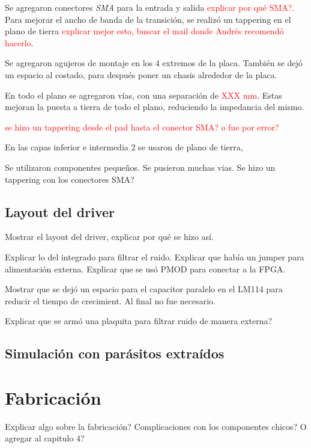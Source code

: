 Se agregaron conectores \textit{SMA} para la entrada y salida
\textcolor{red}{explicar por qué SMA?}. Para mejorar el ancho de banda de la
transición, se realizó un tappering en el plano de tierra
\textcolor{red}{explicar mejor esto, buscar el mail donde Andrés recomendó
hacerlo}.

Se agregaron agujeros de montaje en los 4 extremos de la placa. También se dejó
un espacio al costado, para después poner un chasis alrededor de la placa.

En todo el plano se agregaron vías, con una separación de \textcolor{red}{XXX
mm}. Estas mejoran la puesta a tierra de todo el plano, reduciendo la impedancia
del mismo.

\textcolor{red}{se hizo un tappering desde el pad hasta el conector SMA? o fue
por error?}

En las capas inferior e intermedia 2 se usaron de plano de tierra,

Se utilizaron componentes pequeños. Se pusieron muchas vias. Se hizo un
tappering con los conectores SMA?

\subsection{Layout del driver}

Mostrar el layout del driver, explicar por qué se hizo así.

Explicar lo del integrado para filtrar el ruido. Explicar que había un jumper
para alimentación externa. Explicar que se usó PMOD para conectar a la FPGA.

Mostrar que se dejó un espacio para el capacitor paralelo en el LM114 para
reducir el tiempo de crecimient. Al final no fue necesario.

Explicar que se armó una plaquita para filtrar ruido de manera externa?

\subsection{Simulación con parásitos extraídos}

\section{Fabricación}

Explicar algo sobre la fabricación? Complicaciones con los componentes chicos?
O agregar al capitulo 4?
